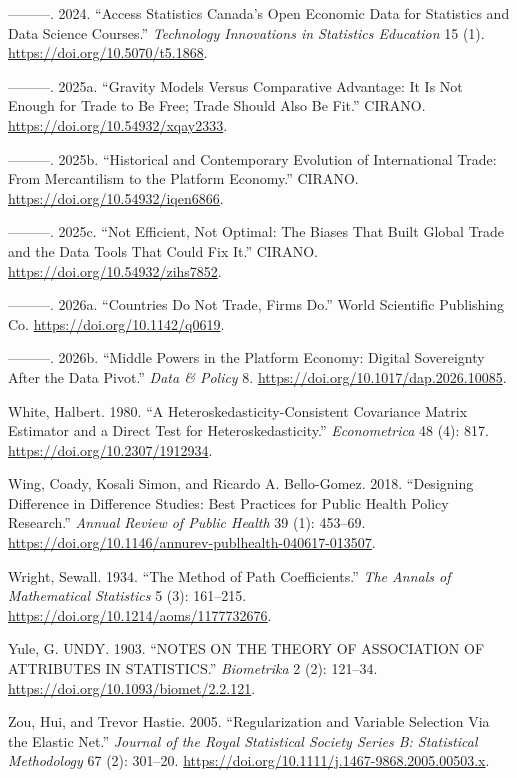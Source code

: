 \documentclass[
  letterpaper,
  10pt,
  twoside,
  openright,
  numbers=noenddot,
  chapterprefix=true]{scrbook}
\newlength{\cslhangindent}
\newenvironment{CSLReferences}[2] %
 {\begin{list}{}{%
  \setlength{\itemindent}{0pt}
  \setlength{\leftmargin}{0pt}
  \setlength{\parsep}{0pt}
  \ifodd #1
   \setlength{\leftmargin}{\cslhangindent}
   \setlength{\itemindent}{-1\cslhangindent}
  \fi
  \setlength{\itemsep}{#2\baselineskip}}}
 {\end{list}}
\begin{document}
\begin{CSLReferences}{1}{0}
---------. 2024. {``{Access} {Statistics} {Canada}'s {Open} {Economic}
{Data} for {Statistics} and {Data} {Science} {Courses}.''}
\emph{{Technology} {Innovations} in {Statistics} {Education}} 15 (1).
\url{https://doi.org/10.5070/t5.1868}.

---------. 2025a. {``{Gravity} {Models} Versus {Comparative}
{Advantage}: {It} Is Not Enough for Trade to Be Free; Trade Should Also
Be Fit.''} {CIRANO}. \url{https://doi.org/10.54932/xqay2333}.

---------. 2025b. {``{Historical} and {Contemporary} {Evolution} of
{International} {Trade}: {From} {Mercantilism} to the {Platform}
{Economy}.''} {CIRANO}. \url{https://doi.org/10.54932/iqen6866}.

---------. 2025c. {``{Not} {Efficient}, {Not} {Optimal}: {The} {Biases}
{That} {Built} {Global} {Trade} and the {Data} {Tools} {That} {Could}
{Fix} {It}.''} {CIRANO}. \url{https://doi.org/10.54932/zihs7852}.

---------. 2026a. {``{Countries} {Do} {Not} {Trade}, {Firms} {Do}.''}
{World} {Scientific} {Publishing} {Co}.
\url{https://doi.org/10.1142/q0619}.

---------. 2026b. {``{Middle} Powers in the Platform Economy: {Digital}
Sovereignty After the Data Pivot.''} \emph{{Data} \& {Policy}} 8.
\url{https://doi.org/10.1017/dap.2026.10085}.

White, Halbert. 1980. {``A {Heteroskedasticity}-{Consistent}
{Covariance} {Matrix} {Estimator} and a {Direct} {Test} for
{Heteroskedasticity}.''} \emph{{Econometrica}} 48 (4): 817.
\url{https://doi.org/10.2307/1912934}.

Wing, Coady, Kosali Simon, and Ricardo A. Bello-Gomez. 2018.
{``{Designing} {Difference} in {Difference} {Studies}: {Best}
{Practices} for {Public} {Health} {Policy} {Research}.''} \emph{{Annual}
{Review} of {Public} {Health}} 39 (1): 453--69.
\url{https://doi.org/10.1146/annurev-publhealth-040617-013507}.

Wright, Sewall. 1934. {``{The} {Method} of {Path} {Coefficients}.''}
\emph{{The} {Annals} of {Mathematical} {Statistics}} 5 (3): 161--215.
\url{https://doi.org/10.1214/aoms/1177732676}.

Yule, G. UNDY. 1903. {``{NOTES} {ON} {THE} {THEORY} {OF} {ASSOCIATION}
{OF} {ATTRIBUTES} {IN} {STATISTICS}.''} \emph{{Biometrika}} 2 (2):
121--34. \url{https://doi.org/10.1093/biomet/2.2.121}.

Zou, Hui, and Trevor Hastie. 2005. {``{Regularization} and {Variable}
{Selection} {Via} the {Elastic} {Net}.''} \emph{{Journal} of the {Royal}
{Statistical} {Society} {Series} B: {Statistical} {Methodology}} 67 (2):
301--20. \url{https://doi.org/10.1111/j.1467-9868.2005.00503.x}.

\end{CSLReferences}


\backmatter
\end{document}
